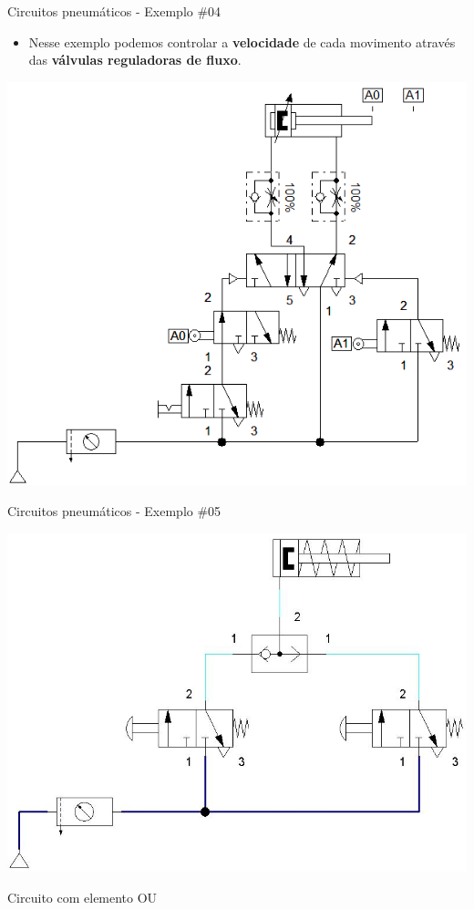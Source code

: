 \begin{frame}{Circuitos pneumáticos - Exemplo \#04}
	\begin{block}{}
		\begin{itemize}
			\item Nesse exemplo podemos controlar a \textbf{velocidade} de cada movimento através das \textbf{válvulas reguladoras de fluxo}.
		\end{itemize}
	\end{block}
	
	\medskip
	
	\centering
	\includegraphics[width=0.55\linewidth]{Figuras/Ch14/fig48}
	
\end{frame}


\begin{frame}{Circuitos pneumáticos - Exemplo \#05}
	
	\centering
	\includegraphics[width=0.8\linewidth]{Figuras/Ch14/fig48n2}
	
	\medskip
	
	Circuito com elemento OU
	
\end{frame}


